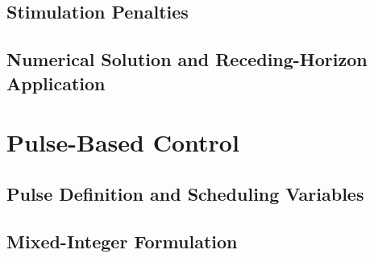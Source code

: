 \subsection{Stimulation Penalties}

\subsection{Numerical Solution and Receding-Horizon Application}

\section{Pulse-Based Control}

\subsection{Pulse Definition and Scheduling Variables}

\subsection{Mixed-Integer Formulation}

